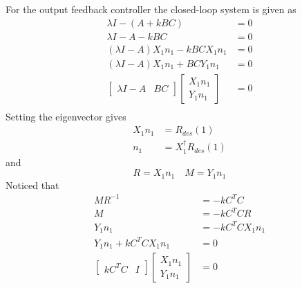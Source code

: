 For the output feedback controller the closed-loop system is given as
\begin{equation}
\begin{split}
    \lambda I-(A+kBC)&=0\\
    \lambda I-A-kBC&=0\\
    (\lambda I-A)X_1n_1-kBCX_1n_1&=0\\
    (\lambda I-A)X_1n_1+BCY_1n_1&=0\\
    \begin{bmatrix}\lambda I-A& BC\end{bmatrix}\begin{bmatrix}X_1n_1\\Y_1n_1\end{bmatrix}&=0\\
\end{split}
\end{equation}
Setting the eigenvector gives
\begin{equation}
    \begin{split}
        X_1n_1&=R_{des}(1)\\
        n_1&=X_1^\dagger R_{des}(1)
    \end{split}
\end{equation}
and 
\begin{equation}
    R=X_1n_1\quad M=Y_1n_1
\end{equation}
Noticed that 
\begin{equation}
\begin{split}
    MR^{-1}&=-kC^TC\\
    M&=-kC^TCR\\
    Y_1n_1&=-kC^TCX_1n_1\\
    Y_1n_1+kC^TCX_1n_1&=0\\
    \begin{bmatrix}kC^TC&I\end{bmatrix}\begin{bmatrix}
    X_1n_1\\Y_1n_1
    \end{bmatrix}&=0
\end{split}
\end{equation}

